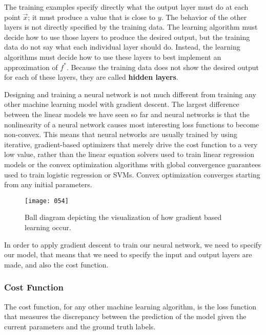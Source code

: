 The training examples specify directly what the output layer must do at each point \(\vec{x}\); it must produce a value that is close to \(y\). The behavior of the other layers is not directly specified by the training data. The learning algorithm must decide how to use those layers to produce the desired output, but the training data do not say what each individual layer should do. Instead, the learning algorithms must decide how to use these layers to best implement an approximation of \(f^*\). Because the training data does not show the desired output for each of these layers, they are called \textbf{hidden layers}.

Designing and training a neural network is not much different from training any other machine learning model with gradient descent. The largest diﬀerence between the linear models we have seen so far and neural networks is that the nonlinearity of a neural network causes most interesting loss functions to become non-convex. This means that neural networks are usually trained by using iterative, gradient-based optimizers that merely drive the cost function to a very low value, rather than the linear equation solvers used to train linear regression models or the convex optimization algorithms with global convergence guarantees used to train logistic regression or SVMs. Convex optimization converges starting from any initial parameters.

\begin{figure}[t!]
    \centering
    \texttt{[image: 054]}
    \caption{Ball diagram depicting the visualization of how gradient based learning occur.}
\end{figure}

In order to apply gradient descent to train our neural network, we need to specify our model, that means that we need to specify the input and output layers are made, and also the cost function.

\subsubsection{Cost Function}
The cost function, for any other machine learning algorithm, is the loss function that measures the discrepancy between the prediction of the model given the current parameters and the ground truth labels.

